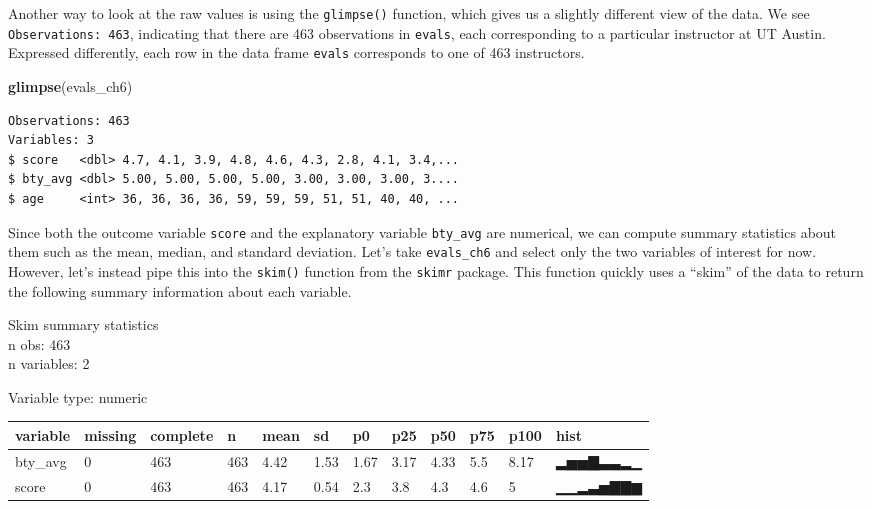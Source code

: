 \documentclass[12pt,]{krantz}
\makeatletter
\newenvironment{Shaded}{\begin{snugshade}}{\end{snugshade}}
\newcommand{\KeywordTok}[1]{\textcolor[rgb]{0.27,0.27,0.27}{\textbf{#1}}}
\newcommand{\StringTok}[1]{\textcolor[rgb]{0.5,0.5,0.5}{#1}}
\newcommand{\OperatorTok}[1]{\textcolor[rgb]{0.43,0.43,0.43}{\textbf{#1}}}
\newcommand{\NormalTok}[1]{#1}
\newenvironment{kframe}{%
\medskip{}
\setlength{\fboxsep}{.8em}
 \def\at@end@of@kframe{}%
 \ifinner\ifhmode%
  \def\at@end@of@kframe{\end{minipage}}%
  \begin{minipage}{\columnwidth}%
 \fi\fi%
 \def\FrameCommand##1{\hskip\@totalleftmargin \hskip-\fboxsep
 \colorbox{shadecolor}{##1}\hskip-\fboxsep
     \hskip-\linewidth \hskip-\@totalleftmargin \hskip\columnwidth}%
 \MakeFramed {\advance\hsize-\width
   \@totalleftmargin\z@ \linewidth\hsize
   \@setminipage}}%
 {\par\unskip\endMakeFramed%
 \at@end@of@kframe}
\renewenvironment{Shaded}{\begin{kframe}}{\end{kframe}}
\theoremstyle{definition}
\theoremstyle{definition}
\theoremstyle{definition}
\theoremstyle{remark}
\makeatother
\begin{document}
Another way to look at the raw values is using the \texttt{glimpse()}
function, which gives us a slightly different view of the data. We see
\texttt{Observations:\ 463}, indicating that there are 463 observations
in \texttt{evals}, each corresponding to a particular instructor at UT
Austin. Expressed differently, each row in the data frame \texttt{evals}
corresponds to one of 463 instructors.

\begin{Shaded}
\begin{Highlighting}[]
\KeywordTok{glimpse}\NormalTok{(evals_ch6)}
\end{Highlighting}
\end{Shaded}

\begin{verbatim}
Observations: 463
Variables: 3
$ score   <dbl> 4.7, 4.1, 3.9, 4.8, 4.6, 4.3, 2.8, 4.1, 3.4,...
$ bty_avg <dbl> 5.00, 5.00, 5.00, 5.00, 3.00, 3.00, 3.00, 3....
$ age     <int> 36, 36, 36, 36, 59, 59, 59, 51, 51, 40, 40, ...
\end{verbatim}

Since both the outcome variable \texttt{score} and the explanatory
variable \texttt{bty\_avg} are numerical, we can compute summary
statistics about them such as the mean, median, and standard deviation.
Let's take \texttt{evals\_ch6} and select only the two variables of
interest for now. However, let's instead pipe this into the
\texttt{skim()} function from the \texttt{skimr} package. This function
quickly uses a ``skim'' of the data to return the following summary
information about each variable.

\begin{Shaded}
\end{Shaded}

Skim summary statistics\\
n obs: 463\\
n variables: 2

Variable type: numeric

\begin{tabular}{l|l|l|l|l|l|l|l|l|l|l|l}
\hline
variable & missing & complete & n & mean & sd & p0 & p25 & p50 & p75 & p100 & hist\\
\hline
bty\_avg & 0 & 463 & 463 & 4.42 & 1.53 & 1.67 & 3.17 & 4.33 & 5.5 & 8.17 & ▂▅▅▇▃▃▂▁\\
\hline
score & 0 & 463 & 463 & 4.17 & 0.54 & 2.3 & 3.8 & 4.3 & 4.6 & 5 & ▁▁▂▃▅▇▇▆\\
\hline
\end{tabular}
\end{document}
